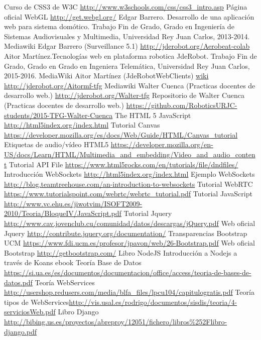\documentclass[oneside,a4paper,11pt]{book}
\begin{document}
\begin{thebibliography}{99}
 Curso de CSS3 de W3C \url{http://www.w3schools.com/css/css3_intro.asp}
 Página oficial WebGL \url{http://get.webgl.org/}  
 Edgar Barrero. Desarrollo de una aplicación web para sistema domótico. Trabajo Fin de Grado, Grado en Ingeniería de Sistemas Audiovisuales y Multimedia, Universidad Rey Juan Carlos, 2013-2014.
 Mediawiki Edgar Barrero (Surveillance 5.1) \url{http://jderobot.org/Aerobeat-colab}
 Aitor Martínez.Tecnologías web en plataforma robotica JdeRobot. Trabajo Fin de Grado, Grado en Grado en Ingeniera Telemática, Universidad Rey Juan Carlos, 2015-2016.
 MediaWiki Aitor Martínez (JdeRobotWebClients) \url{wiki http://jderobot.org/Aitormf-tfg}
 Mediawiki Walter Cuenca (Practicas docentes de desarrollo web.) \url{http://jderobot.org/Walter-tfg} 
 Repositorio de Walter Cuenca (Practicas docentes de desarrollo web.) \url{https://github.com/RoboticsURJC-students/2015-TFG-Walter-Cuenca} 
 The HTML 5 JavaScript  \url{http://html5index.org/index.html}
 Tutorial Canvas  \url{https://developer.mozilla.org/es/docs/Web/Guide/HTML/Canvas\_tutorial}
 Etiquetas de audio/vídeo HTML5  \url{https://developer.mozilla.org/en-US/docs/Learn/HTML/Multimedia\_and\_embedding/Video\_and\_audio\_content}
 Tutorial API File  \url{https://www.html5rocks.com/en/tutorials/file/dndfiles/}
 Introducción WebSockets  \url{http://html5index.org/index.html}
Ejemplo WebSockets  \url{ http://blog.teamtreehouse.com/an-introduction-to-websockets}
Tutorial WebRTC  \url{https://www.tutorialspoint.com/webrtc/webrtc\_tutorial.pdf}
Tutorial JavaScript \url{http://www.vc.ehu.es/jiwotvim/ISOFT2009-2010/Teoria/BloqueIV/JavaScript.pdf}
Tutorial Jquery \url{http://www.cav.jovenclub.cu/comunidad/datos/descargas/jQuery.pdf}
 Web oficial Jquery \url{http://contribute.jquery.org/documentation/}
 Transparencias Bootstrap UCM \url{https://www.fdi.ucm.es/profesor/jpavon/web/26-Bootstrap.pdf}
 Web oficial Bootstrap \url{http://getbootstrap.com/}
 Libro NodeJS \textnormal{Introducción a Nodejs a través de Koans ebook}
 Teoría Base de Datos \url{https://si.ua.es/es/documentos/documentacion/office/access/teoria-de-bases-de-datos.pdf}
 Teoría WebServices \url{http://usershop.redusers.com/media/blfa_files/lpcu104/capitulogratis.pdf}
 Teoría tipos de WebServices\url{http://vis.usal.es/rodrigo/documentos/sisdis/teoria/4-serviciosWeb.pdf}
 Libro Django \url{http://bibing.us.es/proyectos/abreproy/12051/fichero/libros\%252Flibro-django.pdf}
\end{thebibliography}
\end{document}
